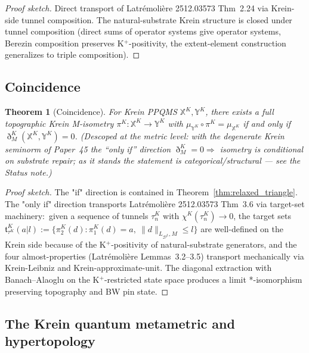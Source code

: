 \documentclass[11pt,a4paper]{article}
\theoremstyle{plain}
\newtheorem{theorem}{Theorem}[section]
\theoremstyle{definition}
\newcommand{\Dcal}{\mathcal{D}}
\newcommand{\norm}[1]{\lVert #1 \rVert}
\newcommand{\Dethmet}{\eth^{K}}
\begin{document}
\begin{proof}[Proof sketch]
Direct transport of Latr\'emoli\`ere 2512.03573 Thm~2.24 via Krein-side
tunnel composition. The natural-substrate Krein structure is closed
under tunnel composition (direct sums of operator systems give operator
systems, Berezin composition preserves K$^{+}$-positivity, the
extent-element construction generalizes to triple composition).
\end{proof}

\subsection{Coincidence}\label{sec:coincidence}

\begin{theorem}[Coincidence]\label{thm:coincidence}
For Krein PPQMS $\mathbb{X}^{K}, \mathbb{Y}^{K}$, there exists a
full topographic Krein M-isometry $\pi^{K} : \mathbb{X}^{K} \to
\mathbb{Y}^{K}$ with $\mu_{\mathbb{Y}^{K}} \circ \pi^{K} =
\mu_{\mathbb{X}^{K}}$ if and only if
$\Dethmet_{M}(\mathbb{X}^{K}, \mathbb{Y}^{K}) = 0$.
\emph{(Descoped at the metric level: with the degenerate Krein seminorm
of Paper~45 the ``only if'' direction $\Dethmet_{M}=0\Rightarrow$
isometry is conditional on substrate repair; as it stands the statement
is categorical/structural --- see the Status note.)}
\end{theorem}

\begin{proof}[Proof sketch]
The "if" direction is contained in Theorem~\ref{thm:relaxed_triangle}.
The "only if" direction transports Latr\'emoli\`ere 2512.03573
Thm~3.6 via target-set machinery:\ given a sequence of tunnels
$\tau_{n}^{K}$ with $\chi^{K}(\tau_{n}^{K}) \to 0$, the target sets
$\mathfrak{t}_{\tau^{K}}^{K}(a | l) :=
\{\pi_{2}^{K}(d) : \pi_{1}^{K}(d) = a,\ \norm{d}_{L_{\Dcal^{L}}, M}
\le l\}$ are well-defined on the Krein side because of the
K$^{+}$-positivity of natural-substrate generators, and the four
almost-properties (Latr\'emoli\`ere Lemmas~3.2--3.5) transport
mechanically via Krein-Leibniz and Krein-approximate-unit. The
diagonal extraction with Banach--Alaoglu on the K$^{+}$-restricted
state space produces a limit *-isomorphism preserving topography and
BW pin state.
\end{proof}

\subsection{The Krein quantum metametric and
hypertopology}\label{sec:krein_hypertopology_metametric}
\end{document}
